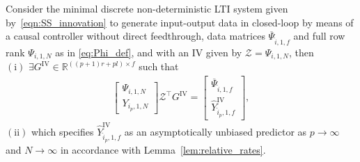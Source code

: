\begin{thm}\label{theorem:main_result_IVs}
    Consider the minimal discrete non-deterministic \ac{LTI} system given by~\eqref{eqn:SS_innovation} to generate input-output data in closed-loop by means of a causal controller without direct feedthrough, data matrices $\overline{\Psi}_{\hat{i},1,f}$ and full row rank $\Psi_{i,1,N}$ as in \eqref{eq:Phi_def}, and with an \ac{IV} given by $\mathcal{Z}=\Psi_{i,1,N}$, then\\
    $\mathrm{(i)}$ $\exists G^\mathrm{IV}\in\mathbb{R}^{((p+1)r+pl)\times f}$ such that
    \begin{align}\label{eq:Theorem2}
        \begin{bmatrix}
            \Psi_{i,1,N}\\Y_{i_p,1,N}
        \end{bmatrix}\mathcal{Z}^\top G^\mathrm{IV} =
        \begin{bmatrix}
            \overline{\Psi}_{\hat{i},1,f}\\\widehat{Y}_{\hat{i}_p,1,f}^\mathrm{IV}
        \end{bmatrix},
    \end{align}
    $\mathrm{(ii)}$ which specifies $\widehat{Y}_{\hat{i}_p,1,f}^\mathrm{IV}$ as an asymptotically unbiased predictor as $p\rightarrow\infty$ and $N\rightarrow\infty$ in accordance with Lemma~\ref{lem:relative_rates}. %
\end{thm}
%

